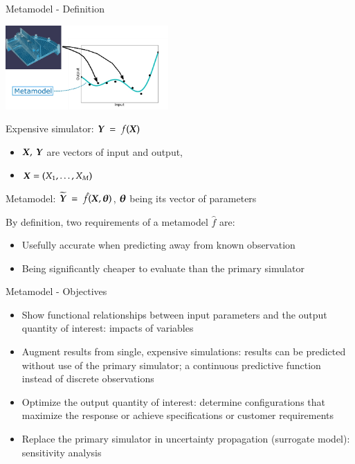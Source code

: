 \documentclass[9pt]{beamer}
\begin{document}
\begin{frame}[t]{Metamodel - Definition}

\begin{center}
 \includegraphics[height=3.2cm]{../Pics/resp_surf_sketch.jpg}
\end{center}


Expensive simulator: $\boldsymbol Y \; = \; f(\boldsymbol X)$
\begin{itemize}
\item $\boldsymbol X,~\boldsymbol Y$ are vectors of input and output,
\item $\boldsymbol X=(X_1,\dots,X_M)$
\end{itemize}
   
Metamodel: $ \widetilde{\boldsymbol Y } \; = \; \hat{f}(\boldsymbol X, \boldsymbol \theta)$, $\boldsymbol \theta$ being its vector of parameters

By definition, two requirements of a metamodel $\hat{f}$ are:
\begin{itemize}
\item Usefully accurate when predicting away from known observation
\item Being significantly cheaper to evaluate than the primary simulator
\end{itemize}
 

\end{frame}

\begin{frame}[t]{Metamodel - Objectives}

\begin{itemize}
\item Show functional relationships between input parameters and the output quantity of interest: impacts of variables 
\item Augment results from single, expensive simulations: results can be predicted without use of the primary simulator; a continuous predictive function instead of discrete observations
\item Optimize the output quantity of interest: determine configurations that maximize the response or achieve specifications or customer requirements
\item Replace the primary simulator in uncertainty propagation (surrogate model):  sensitivity analysis
\end{itemize}

\end{frame}
\end{document}
